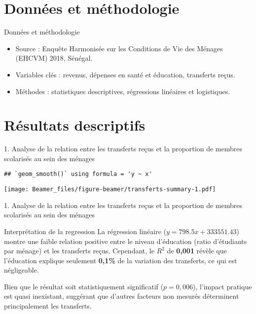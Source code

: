 \documentclass[
  11pt,
  ignorenonframetext,
]{beamer}
\providecommand{\tightlist}{%
  \setlength{\itemsep}{0pt}\setlength{\parskip}{0pt}}
\begin{document}
\section{Données et méthodologie}\label{donnuxe9es-et-muxe9thodologie}

\begin{frame}{Données et méthodologie}
\begin{itemize}
\tightlist
\item
  Source : Enquête Harmonisée sur les Conditions de Vie des Ménages
  (EHCVM) 2018, Sénégal.
\item
  Variables clés : revenus, dépenses en santé et éducation, transferts
  reçus.
\item
  Méthodes : statistiques descriptives, régressions linéaires et
  logistiques.
\end{itemize}
\end{frame}

\section{Résultats descriptifs}\label{ruxe9sultats-descriptifs}

\begin{frame}[fragile]{1. Analyse de la relation entre les transferts
reçus et la proportion de membres scolarisés au sein des ménages}
\label{analyse-de-la-relation-entre-les-transferts-reuxe7us-et-la-proportion-de-membres-scolarisuxe9s-au-sein-des-muxe9nages}
\begin{verbatim}
## `geom_smooth()` using formula = 'y ~ x'
\end{verbatim}

\texttt{[image: Beamer\_files/figure-beamer/transferts-summary-1.pdf]}
\end{frame}

\begin{frame}{1. Analyse de la relation entre les transferts reçus et la
proportion de membres scolarisés au sein des ménages}
\label{analyse-de-la-relation-entre-les-transferts-reuxe7us-et-la-proportion-de-membres-scolarisuxe9s-au-sein-des-muxe9nages-1}
\begin{block}{Interprétation de la regression}
\label{interpruxe9tation-de-la-regression}
La régression linéaire (\(y = 798.5x + 333551.43\)) montre une faible
relation positive entre le niveau d'éducation (ratio d'étudiants par
ménage) et les transferts reçus. Cependant, le \(R^2\) de \textbf{0,001}
révèle que l'éducation explique seulement \textbf{0,1\%} de la variation
des transferts, ce qui est négligeable.

Bien que le résultat soit statistiquement significatif (\(p = 0,006\)),
l'impact pratique est quasi inexistant, suggérant que d'autres facteurs
non mesurés déterminent principalement les transferts.
\end{block}
\end{frame}
\end{document}
